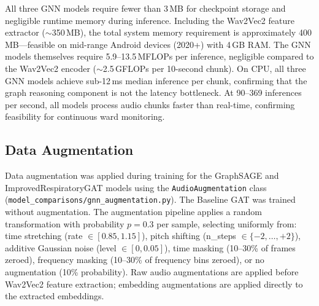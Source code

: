 \noindent All three GNN models require fewer than 3\,MB for checkpoint
storage and negligible runtime memory during inference. Including the
Wav2Vec2 feature extractor ($\sim$350\,MB), the total system memory
requirement is approximately 400\,MB---feasible on mid-range Android devices
(2020+) with 4\,GB RAM. The GNN models themselves require 5.9--13.5\,MFLOPs
per inference, negligible compared to the Wav2Vec2 encoder ($\sim$2.5\,GFLOPs
per 10-second chunk). On CPU, all three GNN models achieve sub-12\,ms median
inference per chunk, confirming that the graph reasoning component is not
the latency bottleneck. At 90--369 inferences per second, all models process
audio chunks faster than real-time, confirming feasibility for continuous
ward monitoring.

\subsection{Data Augmentation}

Data augmentation was applied during training for the GraphSAGE and
ImprovedRespiratoryGAT models using the \texttt{AudioAugmentation} class
(\texttt{model\_comparisons/gnn\_augmentation.py}). The Baseline GAT was
trained without augmentation. The augmentation pipeline applies a random
transformation with probability $p=0.3$ per sample, selecting uniformly from:
time stretching (rate $\in [0.85, 1.15]$), pitch shifting (n\_steps $\in
\{-2, \ldots, +2\}$), additive Gaussian noise (level $\in [0, 0.05]$),
time masking (10--30\% of frames zeroed), frequency masking (10--30\% of
frequency bins zeroed), or no augmentation (10\% probability). Raw audio
augmentations are applied before Wav2Vec2 feature extraction; embedding
augmentations are applied directly to the extracted embeddings.